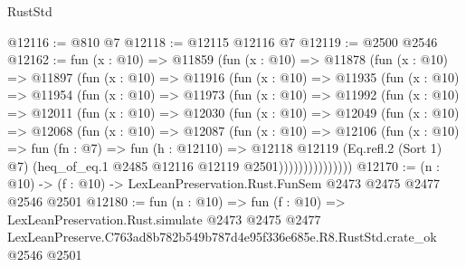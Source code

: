 \begin{lexlean}{RustStd}
\begin{coremodule}
@12116 := @810 @7
@12118 := @12115 @12116 @7
@12119 := @2500 @2546
@12162 := fun (x : @10) =>
  @11859
    (fun (x : @10) =>
    @11878
      (fun (x : @10) =>
      @11897
        (fun (x : @10) =>
        @11916
          (fun (x : @10) =>
          @11935
            (fun (x : @10) =>
            @11954
              (fun (x : @10) =>
              @11973
                (fun (x : @10) =>
                @11992
                  (fun (x : @10) =>
                  @12011
                    (fun (x : @10) =>
                    @12030
                      (fun (x : @10) =>
                      @12049
                        (fun (x : @10) =>
                        @12068
                          (fun (x : @10) =>
                          @12087
                            (fun (x : @10) =>
                            @12106
                              (fun (x : @10) =>
                              fun (fn : @7) =>
                              fun (h : @12110) =>
                              @12118
                                @12119
                                (Eq.refl.{2} (Sort 1) @7)
                                (heq_of_eq.{1} @2485 @12116 @12119 @2501)))))))))))))))
@12170 := (n : @10) -> (f : @10) -> LexLeanPreservation.Rust.FunSem @2473 @2475 @2477 @2546 @2501
@12180 := fun (n : @10) =>
  fun (f : @10) =>
  LexLeanPreservation.Rust.simulate
    @2473
    @2475
    @2477
    LexLeanPreserve.C763ad8b782b549b787d4e95f336e685e.R8.RustStd.crate_ok
    @2546
    @2501
\end{coremodule}
\end{lexlean}
